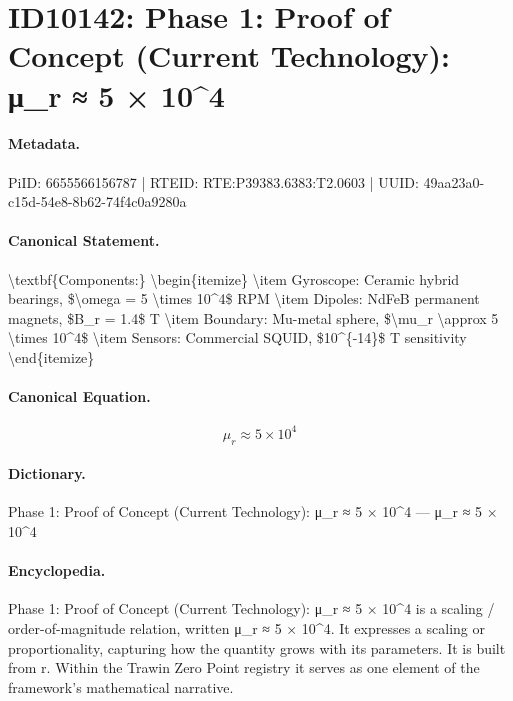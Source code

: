 \section*{ID10142: Phase 1: Proof of Concept (Current Technology): μ\_r ≈ 5 × 10\textasciicircum{}4}
\paragraph{Metadata.}
PiID: 6655566156787 | RTEID: RTE:P39383.6383:T2.0603 | UUID: 49aa23a0-c15d-54e8-8b62-74f4c0a9280a

\paragraph{Canonical Statement.}
\textbackslash{}textbf\{Components:\} \textbackslash{}begin\{itemize\} \textbackslash{}item Gyroscope: Ceramic hybrid bearings, \$\textbackslash{}omega = 5 \textbackslash{}times 10\textasciicircum{}4\$ RPM \textbackslash{}item Dipoles: NdFeB permanent magnets, \$B\_r = 1.4\$ T \textbackslash{}item Boundary: Mu-metal sphere, \$\textbackslash{}mu\_r \textbackslash{}approx 5 \textbackslash{}times 10\textasciicircum{}4\$ \textbackslash{}item Sensors: Commercial SQUID, \$10\textasciicircum{}\{-14\}\$ T sensitivity \textbackslash{}end\{itemize\}

\paragraph{Canonical Equation.}
\[
\mu_r \approx 5 \times 10^4
\]

\paragraph{Dictionary.}
Phase 1: Proof of Concept (Current Technology): μ\_r ≈ 5 × 10\textasciicircum{}4 — μ\_r ≈ 5 × 10\textasciicircum{}4

\paragraph{Encyclopedia.}
Phase 1: Proof of Concept (Current Technology): μ\_r ≈ 5 × 10\textasciicircum{}4 is a scaling / order-of-magnitude relation, written μ\_r ≈ 5 × 10\textasciicircum{}4. It expresses a scaling or proportionality, capturing how the quantity grows with its parameters. It is built from r. Within the Trawin Zero Point registry it serves as one element of the framework's mathematical narrative.
